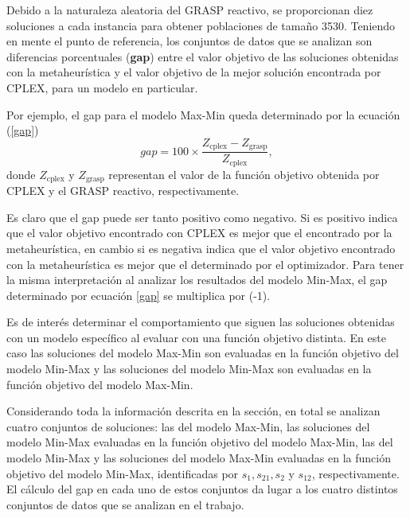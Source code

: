 \documentclass[preprint,12pt,authoryear]{elsarticle}
\begin{document}
Debido a la naturaleza aleatoria del GRASP reactivo, se proporcionan diez soluciones a cada instancia para obtener poblaciones de tamaño 3530. Teniendo en mente el punto de referencia, los conjuntos de datos que se analizan son diferencias porcentuales ({\bf gap}) entre el valor objetivo de las soluciones obtenidas con la metaheurística y el valor objetivo de la mejor solución encontrada por CPLEX, para un modelo en particular.

Por ejemplo, el gap para el modelo Max-Min queda determinado por la ecuación (\ref{gap})
\begin{equation}
gap = 100 \times \frac{Z_{\mbox{cplex}} - Z_{\mbox{grasp}}}{Z_{\mbox{cplex}}},
\label{gap}
\end{equation} 
donde $Z_{\mbox{cplex}}$ y $Z_{\mbox{grasp}}$ representan el valor de la funci\'on objetivo obtenida por CPLEX y el GRASP reactivo, respectivamente.

Es claro que el gap puede ser tanto positivo como negativo. Si es positivo indica que el valor objetivo encontrado con CPLEX es mejor que el encontrado por la metaheurística, en cambio si es negativa indica que el valor objetivo encontrado con la metaheurística es mejor que el determinado por el optimizador. Para tener la misma interpretación al analizar los resultados del modelo Min-Max, el gap determinado por ecuación \ref{gap} se multiplica por (-1).

Es de interés determinar el comportamiento que siguen las soluciones obtenidas con un modelo específico al evaluar con una función objetivo distinta. En este caso las soluciones del modelo Max-Min son evaluadas en la función objetivo del modelo Min-Max y las soluciones del modelo Min-Max son evaluadas en la función objetivo del modelo Max-Min. 

Considerando toda la información descrita en la sección, en total se analizan cuatro conjuntos de soluciones: las del modelo Max-Min, las soluciones del modelo Min-Max evaluadas en la función objetivo del modelo Max-Min, las del modelo Min-Max y las soluciones del modelo Max-Min evaluadas en la función objetivo del modelo Min-Max, identificadas por $s_1, s_{21}, s_2$ y $s_{12}$, respectivamente. El cálculo del gap en cada uno de estos conjuntos da lugar a los cuatro distintos conjuntos de datos que se analizan en el trabajo. 
\end{document}

